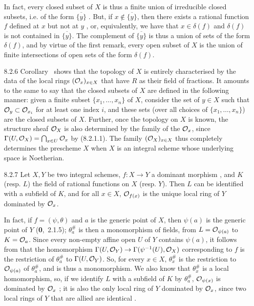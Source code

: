 \documentclass[../main.tex]{subfiles}
\begin{document}
In fact, every closed subset of $X$ is thus a finite union of irreducible closed subsets, i.e. of the form $\overline{\{y\}}$ .
But, if $x\not\in\overline{\{y\}}$, then there exists a rational function $f$ defined at $x$ but not at $y$ , or, equivalently, we have that $x\in\delta(f)$ and $\delta(f)$ is not contained in $\overline{\{y\}}$.
The complement  of $\overline{\{y\}}$ is thus a union of sets of the form $\delta(f)$, and by virtue of the first remark, every open subset of $X$ is the union of finite intersections of open sets of the form $\delta(f)$.

\begin{env}{8.2.6}
    Corollary~ shows that the topology of $X$ is entirely characterised by the data of the local rings $(\mathcal{O}_x)_{x\in X}$ that have $R$ as their field of fractions.
    It amounts to the same to say that the closed subsets of $X$ are defined in the following manner: given a finite subset $\{x_1,\ldots,x_n\}$ of $X$, consider the set of $y\in X$ such that $\mathcal{O}_y\subset\mathcal{O}_{x_i}$ for at least one index $i$, and these sets (over all choices of $\{x_1,\ldots,x_n\}$) are the closed subsets of $X$.
    Further, once the topology on $X$ is known, the structure sheaf $\mathcal{O}_X$ is also determined by the family of the $\mathcal{O}_x$, since $\Gamma(U,\mathcal{O}_X)=\bigcap_{x\in U}\mathcal{O}_x$ by (8.2.1.1).
    The family $(\mathcal{O}_X)_{x\in X}$ thus completely determines the prescheme $X$ when $X$ is an integral scheme whose underlying space is Noetherian.
\end{env}

\begin{env}[Proposition]{8.2.7}
    Let $X,Y$ be two integral schemes, $f\colon X\to Y$ a dominant morphism , and $K$ (resp. $L$) the field of rational functions on $X$ (resp. $Y$).
    Then $L$ can be identified with a subfield of $K$, and for all $x\in X$, $\mathcal{O}_{f(x)}$ is the unique local ring of $Y$ dominated by $\mathcal{O}_x$.
\end{env}

In fact, if $f=(\psi,\theta)$ and $a$ is the generic point of $X$, then $\psi(a)$ is the generic point of $Y$ (\textbf{0},~2.1.5); $\theta_a^\#$ is then a monomorphism of fields, from $L=\mathcal{O}_{\psi(a)}$ to $K=\mathcal{O}_a$.
Since every non-empty affine open $U$ of $Y$ contains $\psi(a)$, it follows from  that the homomorphism $\Gamma(U,\mathcal{O}_Y)\to\Gamma(\psi^{-1}(U),\mathcal{O}_X)$ corresponding to $f$ is the restriction of $\theta_a^\#$ to $\Gamma(U,\mathcal{O}_Y)$.
So, for every $x\in X$, $\theta_x^\#$ is the restriction to $\mathcal{O}_{\psi(a)}$ of $\theta_a^\#$, and is thus a monomorphism.
We also know that $\theta_x^\#$ is a local homomorphism, so, if we identify $L$ with a subfield of $K$ by $\theta_a^\#$, $\mathcal{O}_{\psi(x)}$ is dominated by $\mathcal{O}_x$ ; it is also the only local ring of $Y$ dominated by $\mathcal{O}_x$, since two local rings of $Y$ that are allied are identical .
\end{document}
